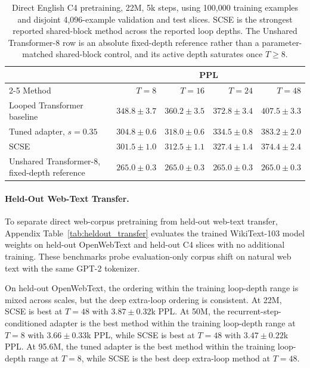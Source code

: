 \documentclass[letterpaper]{article} %
\newcommand{\SCSE}{\textsc{SCSE}}
\theoremstyle{remark}
\begin{document}
\begin{table}[t!]
	\centering
	\scriptsize
	\begin{tabular}{lrrrr}
		\toprule
		                                              & \multicolumn{4}{c}{PPL}                                                                            \\
		\cmidrule(lr){2-5}
		Method                                        & $T=8$                   & $T=16$                 & $T=24$                 & $T=48$                 \\
		\midrule
		Looped Transformer baseline                   & $348.8\pm3.7$           & $360.2\pm3.5$          & $372.8\pm3.4$          & $407.5\pm3.3$          \\
		Tuned adapter, $s=0.35$                       & $304.8\pm0.6$           & $318.0\pm0.6$          & $334.5\pm0.8$          & $383.2\pm2.0$          \\
		\SCSE{}                                       & $\mathbf{301.5\pm1.0}$  & $\mathbf{312.5\pm1.1}$ & $\mathbf{327.4\pm1.4}$ & $\mathbf{374.4\pm2.4}$ \\
		\addlinespace[2pt]
		Unshared Transformer-8, fixed-depth reference & $265.0\pm0.3$           & $265.0\pm0.3$          & $265.0\pm0.3$          & $265.0\pm0.3$          \\
		\bottomrule
	\end{tabular}
	\caption{Direct English C4 pretraining, 22M, 5k steps, using 100,000 training examples and disjoint 4,096-example validation and test slices.  \SCSE{} is the strongest reported shared-block method across the reported loop depths.  The Unshared Transformer-8 row is an absolute fixed-depth reference rather than a parameter-matched shared-block control, and its active depth saturates once $T\ge 8$.}
	\label{tab:c4_train}
\end{table}

\paragraph{Held-Out Web-Text Transfer.} To separate direct web-corpus pretraining from held-out web-text transfer, Appendix Table~\ref{tab:heldout_transfer} evaluates the trained WikiText-103 model weights on held-out OpenWebText and held-out C4 slices with no additional training.  These benchmarks probe evaluation-only corpus shift on natural web text with the same GPT-2 tokenizer.

On held-out OpenWebText, the ordering within the training loop-depth range is mixed across scales, but the deep extra-loop ordering is consistent.  At 22M, \SCSE{} is best at $T=48$ with $3.87\pm0.32$k PPL.  At 50M, the recurrent-step-conditioned adapter is the best method within the training loop-depth range at $T=8$ with $3.66\pm0.33$k PPL, while \SCSE{} is best at $T=48$ with $3.47\pm0.22$k PPL.  At 95.6M, the tuned adapter is the best method within the training loop-depth range at $T=8$, while \SCSE{} is the best deep extra-loop method at $T=48$.
\end{document}
